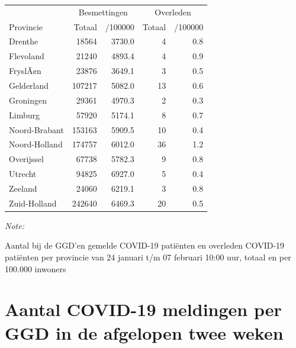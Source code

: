\documentclass[
  english,
  man,floatsintext]{apa6}
\begin{document}
\begin{table}
\centering
\begin{threeparttable}
\begin{tabular}{lrrrr}
\toprule
\multicolumn{1}{c}{ } & \multicolumn{2}{c}{Besmettingen} & \multicolumn{2}{c}{Overleden} \\
\cmidrule(l{3pt}r{3pt}){2-3} \cmidrule(l{3pt}r{3pt}){4-5}
Provincie & Totaal & /100000 & Totaal & /100000\\
\midrule
Drenthe & 18564 & 3730.0 & 4 & 0.8\\
Flevoland & 21240 & 4893.4 & 4 & 0.9\\
FryslÃ¢n & 23876 & 3649.1 & 3 & 0.5\\
Gelderland & 107217 & 5082.0 & 13 & 0.6\\
Groningen & 29361 & 4970.3 & 2 & 0.3\\
Limburg & 57920 & 5174.1 & 8 & 0.7\\
Noord-Brabant & 153163 & 5909.5 & 10 & 0.4\\
Noord-Holland & 174757 & 6012.0 & 36 & 1.2\\
Overijssel & 67738 & 5782.3 & 9 & 0.8\\
Utrecht & 94825 & 6927.0 & 5 & 0.4\\
Zeeland & 24060 & 6219.1 & 3 & 0.8\\
Zuid-Holland & 242640 & 6469.3 & 20 & 0.5\\
\bottomrule
\end{tabular}
\begin{tablenotes}
\item \textit{Note: } 
\item Aantal bij de GGD’en gemelde COVID-19 patiënten en overleden COVID-19 patiënten per provincie van 24 januari t/m 07 februari 10:00 uur, totaal en per 100.000 inwoners
\end{tablenotes}
\end{threeparttable}
\end{table}

\newpage

\hypertarget{aantal-covid-19-meldingen-per-ggd-in-de-afgelopen-twee-weken}{%
\section{Aantal COVID-19 meldingen per GGD in de afgelopen twee weken}\label{aantal-covid-19-meldingen-per-ggd-in-de-afgelopen-twee-weken}}
\end{document}
